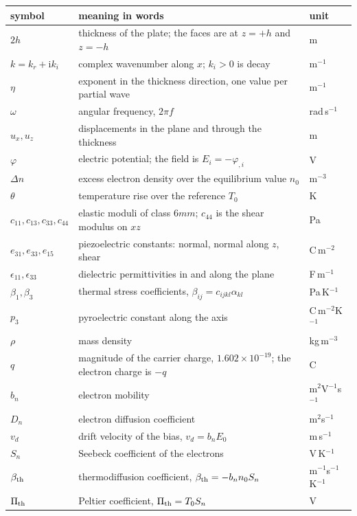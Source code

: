 \documentclass[11pt]{article}
\newcommand{\ii}{\mathrm{i}}
\begin{document}
\begin{center}
\small
\begin{tabular}{p{2.1cm}p{7.6cm}p{4.3cm}}
\toprule
symbol & meaning in words & unit\\
\midrule
$2h$ & thickness of the plate; the faces are at $z=+h$ and $z=-h$ & m\\
$k=k_r+\ii k_i$ & complex wavenumber along $x$; $k_i>0$ is decay & m$^{-1}$\\
$\eta$ & exponent in the thickness direction, one value per partial wave & m$^{-1}$\\
$\omega$ & angular frequency, $2\pi f$ & rad\,s$^{-1}$\\
$u_x,u_z$ & displacements in the plane and through the thickness & m\\
$\varphi$ & electric potential; the field is $E_i=-\varphi_{,i}$ & V\\
$\Delta n$ & excess electron density over the equilibrium value $n_0$ & m$^{-3}$\\
$\theta$ & temperature rise over the reference $T_0$ & K\\
$c_{11},c_{13},c_{33},c_{44}$ & elastic moduli of class $6mm$; $c_{44}$ is the shear modulus on $xz$ & Pa\\
$e_{31},e_{33},e_{15}$ & piezoelectric constants: normal, normal along $z$, shear & C\,m$^{-2}$\\
$\epsilon_{11},\epsilon_{33}$ & dielectric permittivities in and along the plane & F\,m$^{-1}$\\
$\beta_1,\beta_3$ & thermal stress coefficients, $\beta_{ij}=c_{ijkl}\alpha_{kl}$ & Pa\,K$^{-1}$\\
$p_3$ & pyroelectric constant along the axis & C\,m$^{-2}$K$^{-1}$\\
$\rho$ & mass density & kg\,m$^{-3}$\\
$q$ & magnitude of the carrier charge, $1.602\times10^{-19}$; the electron charge is $-q$ & C\\
$b_n$ & electron mobility & m$^2$V$^{-1}$s$^{-1}$\\
$D_n$ & electron diffusion coefficient & m$^2$s$^{-1}$\\
$v_d$ & drift velocity of the bias, $v_d=b_nE_0$ & m\,s$^{-1}$\\
$S_n$ & Seebeck coefficient of the electrons & V\,K$^{-1}$\\
$\beta_{\rm th}$ & thermodiffusion coefficient, $\beta_{\rm th}=-b_nn_0S_n$ & m$^{-1}$s$^{-1}$K$^{-1}$\\
$\Pi_{\rm th}$ & Peltier coefficient, $\Pi_{\rm th}=T_0S_n$ & V\\

\end{tabular}
\end{center}
\end{document}
